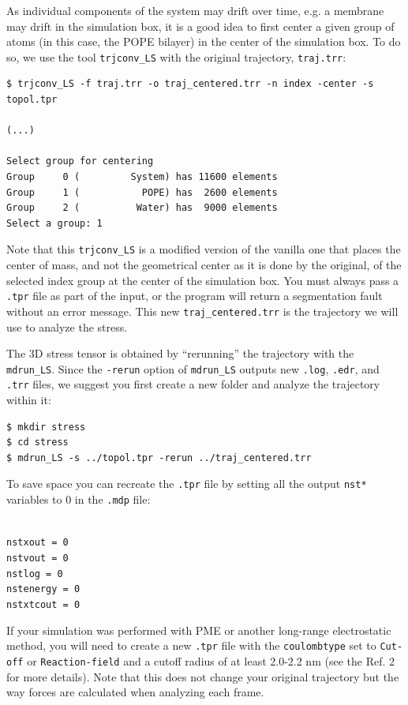 \documentclass[10pt,letterpaper,notitlepage]{article}
\begin{document}
As individual components of the system may drift over time, e.g. a membrane may drift in the simulation box, it is a good idea to first center a given group of atoms (in this case, the POPE bilayer) in the center of the simulation box. To do so, we use the tool \texttt{trjconv\_LS} with the original trajectory, \texttt{traj.trr}:
\begin{lstlisting}[caption=Center the molecule into the simulation box before analyzing the stress]
$ trjconv_LS -f traj.trr -o traj_centered.trr -n index -center -s topol.tpr

(...)

Select group for centering
Group     0 (         System) has 11600 elements
Group     1 (           POPE) has  2600 elements
Group     2 (          Water) has  9000 elements
Select a group: 1
\end{lstlisting}
Note that this \texttt{trjconv\_LS} is a modified version of the vanilla one that places the center of mass, and not the geometrical center as it is done by the original, of the selected index group at the center of the simulation box. You must always pass a \texttt{.tpr} file as part of the input, or the program will return a segmentation fault without an error message. This new \texttt{traj\_centered.trr} is the trajectory we will use to analyze the stress.

The 3D stress tensor is obtained by ``rerunning'' the trajectory with the \texttt{mdrun\_LS}. Since the \texttt{-rerun} option of \texttt{mdrun\_LS} outputs new \texttt{.log}, \texttt{.edr}, and \texttt{.trr} files, we suggest you first create a new folder and analyze the trajectory within it:
\begin{lstlisting}[caption=Computing the stress with \texttt{mdrun\_LS}]
$ mkdir stress
$ cd stress
$ mdrun_LS -s ../topol.tpr -rerun ../traj_centered.trr
\end{lstlisting}
To save space you can recreate the \texttt{.tpr} file by setting all the output \texttt{nst*} variables to 0 in the \texttt{.mdp} file:

\texttt{
\footnotesize{
\\nstxout         = 0\\
nstvout         = 0\\
nstlog          = 0\\
nstenergy       = 0\\
nstxtcout       = 0\\
}}

If your simulation was performed with PME or another long-range electrostatic method, you will need to create a new \texttt{.tpr} file with the \texttt{coulombtype} set to \texttt{Cut-off} or \texttt{Reaction-field} and a cutoff radius of at least 2.0-2.2 nm (see the Ref. 2 for more details). Note that this does not change your original trajectory but the way forces are calculated when analyzing each frame.
\end{document}
